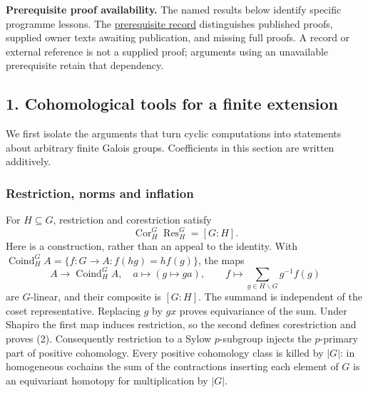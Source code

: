 \documentclass[11pt,a4paper]{article}
\begin{document}
\textbf{Prerequisite proof availability.} The named results below
identify specific programme lessons. The
\href{https://kokunoyumeto.github.io/open-math-courses/courses/NT-CFT/proof-dependencies.html\#lesson-24}{prerequisite
record} distinguishes published proofs, supplied owner texts awaiting
publication, and missing full proofs. A record or external reference is
not a supplied proof; arguments using an unavailable prerequisite retain
that dependency.

\subsection{1. Cohomological tools for a finite
extension}\label{cohomological-tools-for-a-finite-extension}

We first isolate the arguments that turn cyclic computations into
statements about arbitrary finite Galois groups. Coefficients in this
section are written additively.

\subsubsection{Restriction, norms and
inflation}\label{restriction-norms-and-inflation}

For \(H\subseteq G\), restriction and corestriction satisfy \[
\operatorname{Cor}_H^G\operatorname{Res}_H^G=[G:H].
\tag{2}
\] Here is a construction, rather than an appeal to the identity. With
\(\operatorname{Coind}_H^G A=\{f:G\to A:f(hg)=hf(g)\}\), the maps \[
A\longrightarrow\operatorname{Coind}_H^G A,\quad a\longmapsto(g\mapsto ga),
\qquad
f\longmapsto\sum_{g\in H\backslash G}g^{-1}f(g)
\tag{3}
\] are \(G\)-linear, and their composite is \([G:H]\). The summand is
independent of the coset representative. Replacing \(g\) by \(gx\)
proves equivariance of the sum. Under Shapiro the first map induces
restriction, so the second defines corestriction and proves (2).
Consequently restriction to a Sylow \(p\)-subgroup injects the
\(p\)-primary part of positive cohomology. Every positive cohomology
class is killed by \(|G|\): in homogeneous cochains the sum of the
contractions inserting each element of \(G\) is an equivariant homotopy
for multiplication by \(|G|\).
\end{document}
